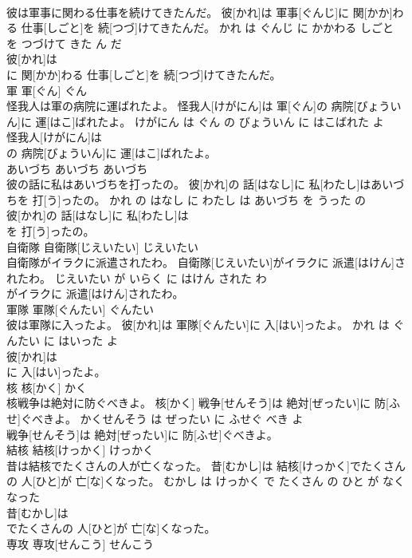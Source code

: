 \documentclass[8pt]{extreport}
\begin{document}
\begin{CJK}{UTF8}{min}
\\	彼は軍事に関わる仕事を続けてきたんだ。	彼[かれ]は 軍事[ぐんじ]に 関[かか]わる 仕事[しごと]を 続[つづ]けてきたんだ。	かれ は ぐんじ に かかわる しごと を つづけて きた ん だ	
\\	彼[かれ]は
\\	に 関[かか]わる 仕事[しごと]を 続[つづ]けてきたんだ。			
\\	軍	軍[ぐん]	ぐん	
\\	怪我人は軍の病院に運ばれたよ。	怪我人[けがにん]は 軍[ぐん]の 病院[びょういん]に 運[はこ]ばれたよ。	けがにん は ぐん の びょういん に はこばれた よ	
\\	怪我人[けがにん]は
\\	の 病院[びょういん]に 運[はこ]ばれたよ。			
\\	あいづち	あいづち	あいづち	
\\	彼の話に私はあいづちを打ったの。	彼[かれ]の 話[はなし]に 私[わたし]はあいづちを 打[う]ったの。	かれ の はなし に わたし は あいづち を うった の	
\\	彼[かれ]の 話[はなし]に 私[わたし]は
\\	を 打[う]ったの。			
\\	自衛隊	自衛隊[じえいたい]	じえいたい	
\\	自衛隊がイラクに派遣されたわ。	自衛隊[じえいたい]がイラクに 派遣[はけん]されたわ。	じえいたい が いらく に はけん された わ	
\\	がイラクに 派遣[はけん]されたわ。			
\\	軍隊	軍隊[ぐんたい]	ぐんたい	
\\	彼は軍隊に入ったよ。	彼[かれ]は 軍隊[ぐんたい]に 入[はい]ったよ。	かれ は ぐんたい に はいった よ	
\\	彼[かれ]は
\\	に 入[はい]ったよ。			
\\	核	核[かく]	かく	
\\	核戦争は絶対に防ぐべきよ。	核[かく] 戦争[せんそう]は 絶対[ぜったい]に 防[ふせ]ぐべきよ。	かくせんそう は ぜったい に ふせぐ べき よ	
\\	戦争[せんそう]は 絶対[ぜったい]に 防[ふせ]ぐべきよ。			
\\	結核	結核[けっかく]	けっかく	
\\	昔は結核でたくさんの人が亡くなった。	昔[むかし]は 結核[けっかく]でたくさんの 人[ひと]が 亡[な]くなった。	むかし は けっかく で たくさん の ひと が なくなった	
\\	昔[むかし]は
\\	でたくさんの 人[ひと]が 亡[な]くなった。			
\\	専攻	専攻[せんこう]	せんこう	

\end{CJK}
\end{document}
